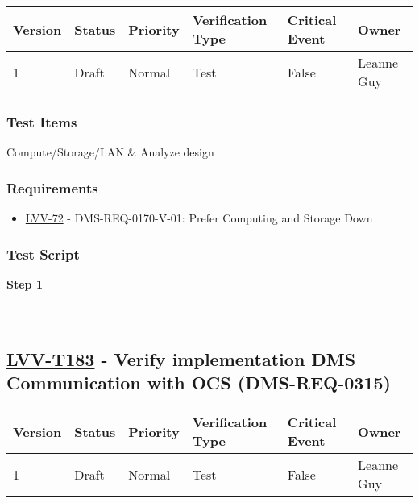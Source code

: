 \begin{longtable}[]{@{}llllll@{}}
\toprule
Version & Status & Priority & Verification Type & Critical Event &
Owner\tabularnewline
\midrule
\endhead
1 & Draft & Normal & Test & False & Leanne Guy\tabularnewline
\bottomrule
\end{longtable}

\hypertarget{test-items-82}{%
\subsubsection{Test Items}\label{test-items-82}}

Compute/Storage/LAN \& Analyze design

\hypertarget{requirements-82}{%
\subsubsection{Requirements}\label{requirements-82}}

\begin{itemize}
\tightlist
\item
  \href{https://jira.lsstcorp.org/browse/LVV-72}{LVV-72} -
  DMS-REQ-0170-V-01: Prefer Computing and Storage Down
\end{itemize}

\hypertarget{test-script-82}{%
\subsubsection{Test Script}\label{test-script-82}}

\textbf{Step 1}\\
~\\
~\\

\hypertarget{lvv-t183---verify-implementation-dms-communication-with-ocs-dms-req-0315}{%
\subsection{\texorpdfstring{\href{https://jira.lsstcorp.org/secure/Tests.jspa\#/testCase/LVV-T183}{LVV-T183}
- Verify implementation DMS Communication with OCS
(DMS-REQ-0315)}{LVV-T183 - Verify implementation DMS Communication with OCS (DMS-REQ-0315)}}\label{lvv-t183---verify-implementation-dms-communication-with-ocs-dms-req-0315}}

\begin{longtable}[]{@{}llllll@{}}
\toprule
Version & Status & Priority & Verification Type & Critical Event &
Owner\tabularnewline
\midrule
\endhead
1 & Draft & Normal & Test & False & Leanne Guy\tabularnewline
\bottomrule
\end{longtable}


